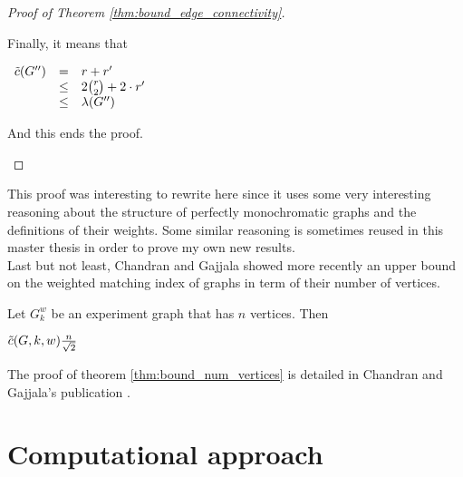 \begin{proof}[Proof of Theorem \ref{thm:bound_edge_connectivity}]
\begin{enumerate}
\begin{enumerate}
                    Finally, it means that
                    
                    \begin{center}
                        $\begin{array}{lcl}
                            \Tilde{c}(G'') & =    & r + r' \\
                                           & \leq & 2 {r \choose 2} + 2 \cdot r' \\
                                           & \leq & \lambda(G'')
                        \end{array}$
                    \end{center}
                    
                    And this ends the proof.
            \end{enumerate}
    \end{enumerate}
\end{proof}

This proof was interesting to rewrite here since it uses some very interesting reasoning about the structure of perfectly monochromatic graphs and the definitions of their weights. Some similar reasoning is sometimes reused in this master thesis in order to prove my own new results. \\

Last but not least, Chandran and Gajjala showed more recently an upper bound on the weighted matching index of graphs in term of their number of vertices. \cite{chandran2023graphtheoretic}

\begin{theorem}
    \label{thm:bound_num_vertices}
    Let $G_k^w$ be an experiment graph that has $n$ vertices. Then
    \begin{center}
        $\Tilde{c}(G, k, w) \frac{n}{\sqrt{2}}$
    \end{center}
\end{theorem}

The proof of theorem \ref{thm:bound_num_vertices} is detailed in Chandran and Gajjala's publication \cite{chandran2023graphtheoretic}.


\section{Computational approach}